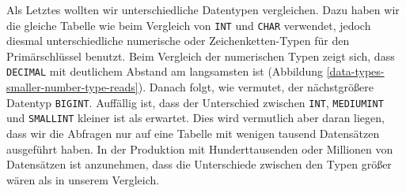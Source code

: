 Als Letztes wollten wir unterschiedliche Datentypen vergleichen.
Dazu haben wir die gleiche Tabelle wie beim Vergleich von \texttt{INT} und \texttt{CHAR} verwendet, jedoch diesmal unterschiedliche numerische oder Zeichenketten-Typen für den Primärschlüssel benutzt.
Beim Vergleich der numerischen Typen zeigt sich, dass \texttt{DECIMAL} mit deutlichem Abstand am langsamsten ist (Abbildung \ref{data-types-smaller-number-type-reads}).
Danach folgt, wie vermutet, der nächstgrößere Datentyp \texttt{BIGINT}.
Auffällig ist, dass der Unterschied zwischen \texttt{INT}, \texttt{MEDIUMINT} und \texttt{SMALLINT} kleiner ist als erwartet.
Dies wird vermutlich aber daran liegen, dass wir die Abfragen nur auf eine Tabelle mit wenigen tausend Datensätzen ausgeführt haben.
In der Produktion mit Hunderttausenden oder Millionen von Datensätzen ist anzunehmen, dass die Unterschiede zwischen den Typen größer wären als in unserem Vergleich.

